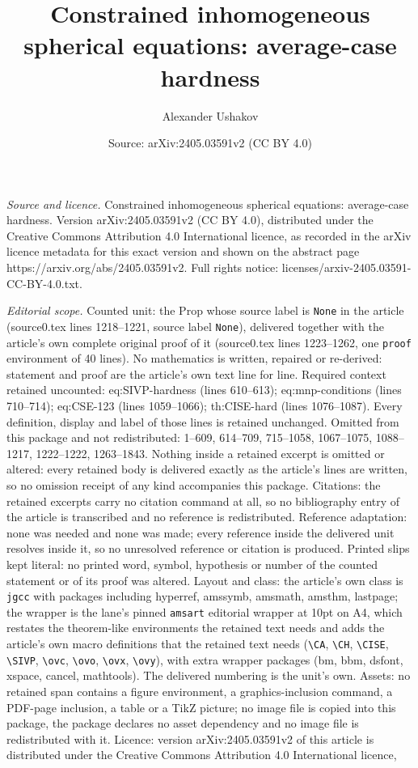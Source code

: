 \documentclass[10pt,a4paper]{amsart}
\title[Constrained inhomogeneous spherical equations: average-case ]{Constrained inhomogeneous spherical equations: average-case hardness}
\author{Alexander Ushakov}
\date{Source: arXiv:2405.03591v2 (CC BY 4.0)}
\begin{document}
\maketitle

\noindent\emph{Source and licence.} Constrained inhomogeneous spherical equations: average-case hardness. Version arXiv:2405.03591v2 (CC BY 4.0), distributed under the Creative Commons Attribution 4.0 International licence, as recorded in the arXiv licence metadata for this exact version and shown on the abstract page https://arxiv.org/abs/2405.03591v2. Full rights notice: licenses/arxiv-2405.03591-CC-BY-4.0.txt.\par\smallskip

\noindent\textit{Editorial scope.} Counted unit: the Prop whose source label is \texttt{None} in the article (source0.tex lines 1218--1221, source label \texttt{None}), delivered together with the article's own complete original proof of it (source0.tex lines 1223--1262, one \texttt{proof} environment of 40 lines). No mathematics is written, repaired or re-derived: statement and proof are the article's own text line for line. Required context retained uncounted: eq:SIVP-hardness (lines 610--613); eq:mnp-conditions (lines 710--714); eq:CSE-123 (lines 1059--1066); th:CISE-hard (lines 1076--1087). Every definition, display and label of those lines is retained unchanged. Omitted from this package and not redistributed: 1--609, 614--709, 715--1058, 1067--1075, 1088--1217, 1222--1222, 1263--1843. Nothing inside a retained excerpt is omitted or altered: every retained body is delivered exactly as the article's lines are written, so no omission receipt of any kind accompanies this package. Citations: the retained excerpts carry no citation command at all, so no bibliography entry of the article is transcribed and no reference is redistributed. Reference adaptation: none was needed and none was made; every reference inside the delivered unit resolves inside it, so no unresolved reference or citation is produced. Printed slips kept literal: no printed word, symbol, hypothesis or number of the counted statement or of its proof was altered. Layout and class: the article's own class is \texttt{jgcc} with packages including hyperref, amssymb, amsmath, amsthm, lastpage; the wrapper is the lane's pinned \texttt{amsart} editorial wrapper at 10pt on A4, which restates the theorem-like environments the retained text needs and adds the article's own macro definitions that the retained text needs (\texttt{\textbackslash CA}, \texttt{\textbackslash CH}, \texttt{\textbackslash CISE}, \texttt{\textbackslash SIVP}, \texttt{\textbackslash ovc}, \texttt{\textbackslash ovo}, \texttt{\textbackslash ovx}, \texttt{\textbackslash ovy}), with extra wrapper packages (bm, bbm, dsfont, xspace, cancel, mathtools). The delivered numbering is the unit's own. Assets: no retained span contains a figure environment, a graphics-inclusion command, a PDF-page inclusion, a table or a TikZ picture; no image file is copied into this package, the package declares no asset dependency and no image file is redistributed with it. Licence: version arXiv:2405.03591v2 of this article is distributed under the Creative Commons Attribution 4.0 International licence, 
\end{document}
